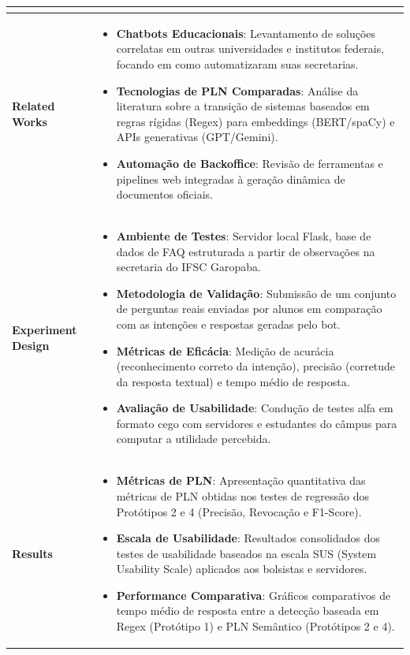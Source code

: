 \documentclass[12pt,a4paper]{article}
\begin{document}
\begin{longtable}{|>{\columncolor{white}\RaggedRight}m{4.0cm}|m{13.0cm}|}
\begin{itemize}[leftmargin=*,noitemsep,topsep=0pt]
    \end{itemize} \\ \hline
    \textbf{Related Works} & 
    \begin{itemize}[leftmargin=*,noitemsep,topsep=0pt]
        \item \textbf{Chatbots Educacionais}: Levantamento de soluções correlatas em outras universidades e institutos federais, focando em como automatizaram suas secretarias.
        \item \textbf{Tecnologias de PLN Comparadas}: Análise da literatura sobre a transição de sistemas baseados em regras rígidas (Regex) para embeddings (BERT/spaCy) e APIs generativas (GPT/Gemini).
        \item \textbf{Automação de Backoffice}: Revisão de ferramentas e pipelines web integradas à geração dinâmica de documentos oficiais.
    \end{itemize} \\ \hline
    \textbf{Experiment Design} & 
    \begin{itemize}[leftmargin=*,noitemsep,topsep=0pt]
        \item \textbf{Ambiente de Testes}: Servidor local Flask, base de dados de FAQ estruturada a partir de observações na secretaria do IFSC Garopaba.
        \item \textbf{Metodologia de Validação}: Submissão de um conjunto de perguntas reais enviadas por alunos em comparação com as intenções e respostas geradas pelo bot.
        \item \textbf{Métricas de Eficácia}: Medição de acurácia (reconhecimento correto da intenção), precisão (corretude da resposta textual) e tempo médio de resposta.
        \item \textbf{Avaliação de Usabilidade}: Condução de testes alfa em formato cego com servidores e estudantes do câmpus para computar a utilidade percebida.
    \end{itemize} \\ \hline
    \textbf{Results} & 
    \begin{itemize}[leftmargin=*,noitemsep,topsep=0pt]
        \item \textbf{Métricas de PLN}: Apresentação quantitativa das métricas de PLN obtidas nos testes de regressão dos Protótipos 2 e 4 (Precisão, Revocação e F1-Score).
        \item \textbf{Escala de Usabilidade}: Resultados consolidados dos testes de usabilidade baseados na escala SUS (System Usability Scale) aplicados aos bolsistas e servidores.
        \item \textbf{Performance Comparativa}: Gráficos comparativos de tempo médio de resposta entre a detecção baseada em Regex (Protótipo 1) e PLN Semântico (Protótipos 2 e 4).

\end{itemize}
\end{longtable}
\end{document}
